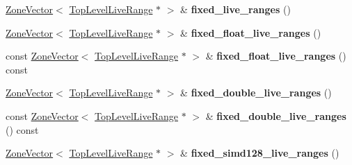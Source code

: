 \begin{DoxyCompactItemize}
\mbox{\hyperlink{classv8_1_1internal_1_1ZoneVector}{Zone\+Vector}}$<$ \mbox{\hyperlink{classv8_1_1internal_1_1compiler_1_1TopLevelLiveRange}{Top\+Level\+Live\+Range}} $\ast$ $>$ \& {\bfseries fixed\+\_\+live\+\_\+ranges} ()
\item 
\mbox{\label{classv8_1_1internal_1_1compiler_1_1RegisterAllocationData_a4a72fd2604fc2de9d11d9ee7f8318906}} 
\mbox{\hyperlink{classv8_1_1internal_1_1ZoneVector}{Zone\+Vector}}$<$ \mbox{\hyperlink{classv8_1_1internal_1_1compiler_1_1TopLevelLiveRange}{Top\+Level\+Live\+Range}} $\ast$ $>$ \& {\bfseries fixed\+\_\+float\+\_\+live\+\_\+ranges} ()
\item 
\mbox{\label{classv8_1_1internal_1_1compiler_1_1RegisterAllocationData_a0af9705780b669ee1d5abae24b672ac0}} 
const \mbox{\hyperlink{classv8_1_1internal_1_1ZoneVector}{Zone\+Vector}}$<$ \mbox{\hyperlink{classv8_1_1internal_1_1compiler_1_1TopLevelLiveRange}{Top\+Level\+Live\+Range}} $\ast$ $>$ \& {\bfseries fixed\+\_\+float\+\_\+live\+\_\+ranges} () const
\item 
\mbox{\label{classv8_1_1internal_1_1compiler_1_1RegisterAllocationData_aff70ac053f82477b2b302d6ba01567cd}} 
\mbox{\hyperlink{classv8_1_1internal_1_1ZoneVector}{Zone\+Vector}}$<$ \mbox{\hyperlink{classv8_1_1internal_1_1compiler_1_1TopLevelLiveRange}{Top\+Level\+Live\+Range}} $\ast$ $>$ \& {\bfseries fixed\+\_\+double\+\_\+live\+\_\+ranges} ()
\item 
\mbox{\label{classv8_1_1internal_1_1compiler_1_1RegisterAllocationData_a1f71d3118d6d60ca20a28bb7444cdf6c}} 
const \mbox{\hyperlink{classv8_1_1internal_1_1ZoneVector}{Zone\+Vector}}$<$ \mbox{\hyperlink{classv8_1_1internal_1_1compiler_1_1TopLevelLiveRange}{Top\+Level\+Live\+Range}} $\ast$ $>$ \& {\bfseries fixed\+\_\+double\+\_\+live\+\_\+ranges} () const
\item 
\mbox{\label{classv8_1_1internal_1_1compiler_1_1RegisterAllocationData_a84f421bfc04d451300ad0fe6f6395281}} 
\mbox{\hyperlink{classv8_1_1internal_1_1ZoneVector}{Zone\+Vector}}$<$ \mbox{\hyperlink{classv8_1_1internal_1_1compiler_1_1TopLevelLiveRange}{Top\+Level\+Live\+Range}} $\ast$ $>$ \& {\bfseries fixed\+\_\+simd128\+\_\+live\+\_\+ranges} ()

\end{DoxyCompactItemize}
